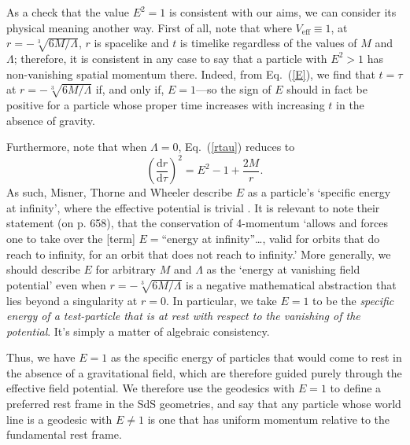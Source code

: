 \documentclass[11pt]{article}
\begin{document}
\begin{appendix}
As a check that the value $E^2=1$ is consistent with our aims, we can consider its physical meaning another way. First of all, note that where $V_{\mathrm{eff}}\equiv1$, at $r=-\sqrt[3]{6M/\Lambda}$, $r$ is spacelike and $t$ is timelike regardless of the values of $M$ and $\Lambda$; therefore, it is consistent in any case to say that a particle with $E^2>1$ has non-vanishing spatial momentum there. Indeed, from Eq.~(\ref{E}), we find that $t=\tau$ at $r=-\sqrt[3]{6M/\Lambda}$ if, and only if, $E=1$---so the sign of $E$ should in fact be positive for a particle whose proper time increases with increasing $t$ in the absence of gravity. 

Furthermore, note that when $\Lambda=0$, Eq.~(\ref{rtau}) reduces to
\begin{equation}
\left(\frac{\mathrm{d}r}{\mathrm{d}\tau}\right)^2=E^2-1+\frac{2M}{r}.\label{rtau_Sch}
\end{equation}
As such, Misner, Thorne and Wheeler describe $E$ as a particle's `specific energy at infinity', where the effective potential is trivial \cite{Misner1973}. It is relevant to note their statement (on p. 658), that the conservation of 4-momentum `allows and forces one to take over the [term] $E=$``energy at infinity''\ldots, valid for orbits that do reach to infinity, for an orbit that does not reach to infinity.' More generally, we should describe $E$ for arbitrary $M$ and $\Lambda$ as the `energy at vanishing field potential' even when $r=-\sqrt[3]{6M/\Lambda}$ is a negative mathematical abstraction that lies beyond a singularity at $r=0$. In particular, we take $E=1$ to be the \textit{specific energy of a test-particle that is at rest with respect to the vanishing of the potential}. It's simply a matter of algebraic consistency.

Thus, we have $E=1$ as the specific energy of particles that would come to rest in the absence of a gravitational field, which are therefore guided purely through the effective field potential. We therefore use the geodesics with $E=1$ to define a preferred rest frame in the SdS geometries, and say that any particle whose world line is a geodesic with $E\neq1$ is one that has uniform momentum relative to the fundamental rest frame.


\end{appendix}
\end{document}
